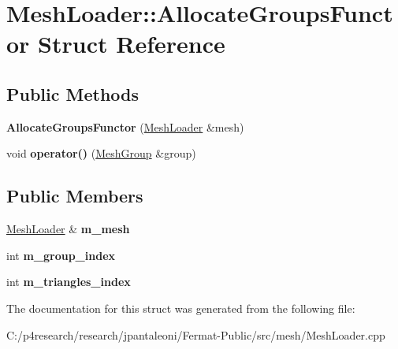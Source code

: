 \hypertarget{struct_mesh_loader_1_1_allocate_groups_functor}{}\section{Mesh\+Loader\+:\+:Allocate\+Groups\+Functor Struct Reference}
\label{struct_mesh_loader_1_1_allocate_groups_functor}
\subsection*{Public Methods}
\begin{DoxyCompactItemize}
\item 
\mbox{\label{struct_mesh_loader_1_1_allocate_groups_functor_afcce4b40a05ad7237d4dca635e8c8c2c}} 
{\bfseries Allocate\+Groups\+Functor} (\hyperlink{class_mesh_loader}{Mesh\+Loader} \&mesh)
\item 
\mbox{\label{struct_mesh_loader_1_1_allocate_groups_functor_abb5d12f17b259522da770d895e865f11}} 
void {\bfseries operator()} (\hyperlink{class_mesh_group}{Mesh\+Group} \&group)
\end{DoxyCompactItemize}
\subsection*{Public Members}
\begin{DoxyCompactItemize}
\item 
\mbox{\label{struct_mesh_loader_1_1_allocate_groups_functor_a4feb1c0c3d45d59e4ba001506c1ea036}} 
\hyperlink{class_mesh_loader}{Mesh\+Loader} \& {\bfseries m\+\_\+mesh}
\item 
\mbox{\label{struct_mesh_loader_1_1_allocate_groups_functor_a746b0ea4fca51bb3681a151de3b7fa03}} 
int {\bfseries m\+\_\+group\+\_\+index}
\item 
\mbox{\label{struct_mesh_loader_1_1_allocate_groups_functor_a91d2cdfcf6249f37a30d16167e889341}} 
int {\bfseries m\+\_\+triangles\+\_\+index}
\end{DoxyCompactItemize}


The documentation for this struct was generated from the following file\+:\begin{DoxyCompactItemize}
\item 
C\+:/p4research/research/jpantaleoni/\+Fermat-\/\+Public/src/mesh/Mesh\+Loader.\+cpp\end{DoxyCompactItemize}

